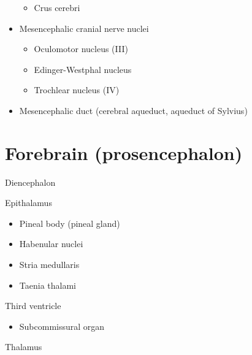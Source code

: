 \begin{itemize}
  \begin{itemize}
  \tightlist
  \item
    Crus cerebri
  \end{itemize}
\item
  Mesencephalic cranial nerve nuclei

  \begin{itemize}
  \tightlist
  \item
    Oculomotor nucleus (III)
  \item
    Edinger-Westphal nucleus
  \item
    Trochlear nucleus (IV)
  \end{itemize}
\item
  Mesencephalic duct (cerebral aqueduct, aqueduct of Sylvius)
\end{itemize}

\hypertarget{forebrain-prosencephalon}{%
\section{Forebrain (prosencephalon)}\label{forebrain-prosencephalon}}

Diencephalon

Epithalamus

\begin{itemize}
\tightlist
\item
  Pineal body (pineal gland)
\item
  Habenular nuclei
\item
  Stria medullaris
\item
  Taenia thalami
\end{itemize}

Third ventricle

\begin{itemize}
\tightlist
\item
  Subcommissural organ
\end{itemize}

Thalamus

